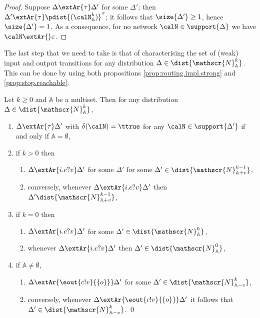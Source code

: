\documentclass{LMCS}
\begin{document}
\begin{proof}
Suppose $\Delta \extAr{\tau} \Delta'$ for some $\Delta'$; 
then $\Delta' \extAr{\tau} \pdist{(\calN^k_{\mathbb{A}})}^{x}$; 
it follows that $ \size{\Delta'} \geq 1$, 
hence $\size{\Delta'} = 1$. As a consequence, 
for no network $\calN \in \support{\Delta}$ we have 
$\calN \extAr{} \varepsilon$.
\end{proof}

The last step that we need to take is that of 
characterising the set of (weak) input and output 
transitions for any distribution $\Delta \in 
\dist{\mathscr{N}^k_{\mathbb{A}}}$. This 
can be done by using both propositions 
\ref{prop:routing.impl.strong} and 
\ref{prop:stop.reachable}.

\begin{prop}
\label{prop:routing.impl.weak}
Let $k \geq 0$ and $\mathbb{A}$ be a multiset. 
Then for any distribution $\Delta \in \dist{\mathscr{N}^k_{\mathbb{A}}}$,

\begin{enumerate}[label=(\roman*)]
\item $\Delta \extAr{\tau} \Delta'$ with 
$\delta(\calN) = \ttrue$ for any $\calN \in \support{\Delta'}$ 
if and only if $\mathbb{A} = \emptyset$, 
\item if $k > 0$ then 
\begin{enumerate}[label=(\roman*)] 
\item $\Delta \extAr{i.c?v} \Delta'$ for some 
$\Delta'$ for some $\Delta' \in \dist{\mathscr{N}^{k-1}_{\mathbb{A} + v}}$, 
\item conversely, whenever $\Delta \extAr{i.c?v} \Delta'$ then 
$\Delta' \dist{\mathscr{N}^{k-1}_{\mathbb{A} + v}}$,
\end{enumerate}

\item if $k=0$ then 
\begin{enumerate}[label=(\roman*)]
\item $\Delta \extAr{i.c?v} \Delta'$ for some 
$\Delta' \in \dist{\mathscr{N}^{0}_{\mathbb{A}}}$, 
\item whenever $\Delta \extAr{i.c?v} \Delta'$ then 
$\Delta' \in \dist{\mathscr{N}^{0}_{\mathbb{A}}}$, 
\end{enumerate}

\item if $\mathbb{A} \neq \emptyset$, 
\begin{enumerate}
\item $\Delta \extAr{\eout{c!v}{\{o\}}} \Delta'$ for 
some $\Delta' \in \dist{\mathscr{N}^{k}_{\mathbb{A} - v}}$, 
\item conversely, whenever $\Delta \extAr{\eout{c!v}{\{o\}}} 
\Delta'$ it follows that $\Delta' \in \dist{\mathscr{N}^{k}_{\mathbb{A} - v}}$.
\qed
\end{enumerate}
\end{enumerate}
\end{prop}
\end{document}
